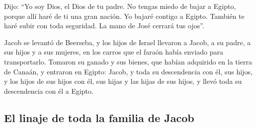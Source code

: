 \begin{paracol}{2}
 Dijo: ``Yo soy Dios, el Dios de tu padre. No tengas miedo
de bajar a Egipto, porque allí haré de ti una gran nación.
 Yo bajaré contigo a Egipto. También te haré subir con
toda seguridad. La mano de José cerrará tus ojos''.

 Jacob se levantó de Beerseba, y los hijos de Israel
llevaron a Jacob, a su padre, a sus hijos y a sus mujeres, en los carros
que el faraón había enviado para transportarlo.  Tomaron
su ganado y sus bienes, que habían adquirido en la tierra de Canaán, y
entraron en Egipto: Jacob, y toda su descendencia con él, 
sus hijos, y los hijos de sus hijos con él, sus hijas y las hijas de sus
hijos, y llevó toda su descendencia con él a Egipto.

\hypertarget{el-linaje-de-toda-la-familia-de-jacob}{%
\subsection{El linaje de toda la familia de
Jacob}\label{el-linaje-de-toda-la-familia-de-jacob}}


\end{paracol}
